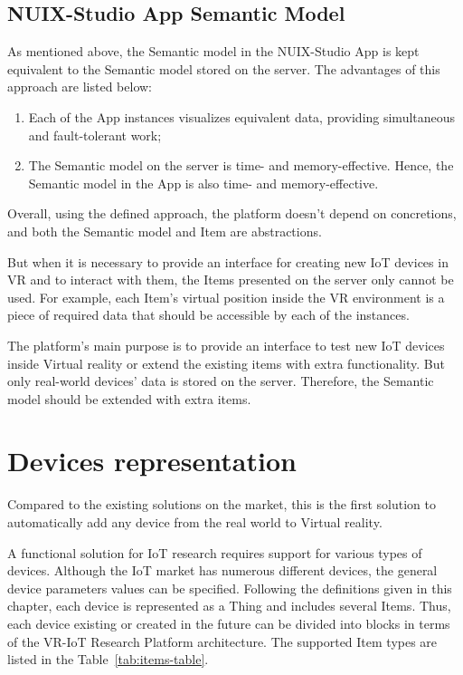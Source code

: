 \subsection{NUIX-Studio App Semantic Model}

As mentioned above, the Semantic model in the NUIX-Studio App is kept equivalent to the Semantic model stored on the server. The advantages of this approach are listed below:

\begin{enumerate}
    \item Each of the App instances visualizes equivalent data, providing simultaneous and fault-tolerant work;
    \item The Semantic model on the server is time- and memory-effective. Hence, the Semantic model in the App is also time- and memory-effective.
\end{enumerate}

Overall, using the defined approach, the platform doesn't depend on concretions, and both the Semantic model and Item are abstractions.

But when it is necessary to provide an interface for creating new IoT devices in VR and to interact with them, the Items presented on the server only cannot be used. For example, each Item's virtual position inside the VR environment is a piece of required data that should be accessible by each of the instances.

The platform's main purpose is to provide an interface to test new IoT devices inside Virtual reality or extend the existing items with extra functionality. But only real-world devices' data is stored on the server. Therefore, the Semantic model should be extended with extra items.

\section{Devices representation}

Compared to the existing solutions on the market, this is the first solution to automatically add any device from the real world to Virtual reality.

A functional solution for IoT research requires support for various types of devices. Although the IoT market has numerous different devices, the general device parameters values can be specified. Following the definitions given in this chapter, each device is represented as a Thing and includes several Items. Thus, each device existing or created in the future can be divided into blocks in terms of the VR-IoT Research Platform architecture. The supported Item types are listed in the Table~\ref{tab:items-table}.


